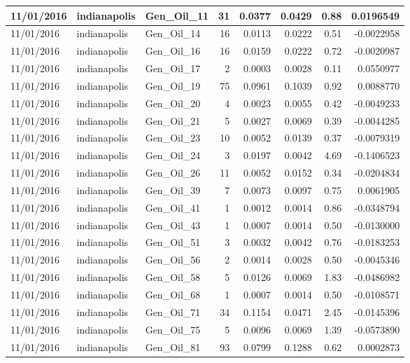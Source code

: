 \documentclass[
  letterpaper,
  DIV=11,
  numbers=noendperiod]{scrartcl}
\begin{document}
\begin{tabular}{l|l|l|r|r|r|r|r}
\hline
11/01/2016 & indianapolis & Gen\_Oil\_11 & 31 & 0.0377 & 0.0429 & 0.88 & 0.0196549\\
\hline
11/01/2016 & indianapolis & Gen\_Oil\_14 & 16 & 0.0113 & 0.0222 & 0.51 & -0.0022958\\
\hline
11/01/2016 & indianapolis & Gen\_Oil\_16 & 16 & 0.0159 & 0.0222 & 0.72 & -0.0020987\\
\hline
11/01/2016 & indianapolis & Gen\_Oil\_17 & 2 & 0.0003 & 0.0028 & 0.11 & 0.0550977\\
\hline
11/01/2016 & indianapolis & Gen\_Oil\_19 & 75 & 0.0961 & 0.1039 & 0.92 & 0.0088770\\
\hline
11/01/2016 & indianapolis & Gen\_Oil\_20 & 4 & 0.0023 & 0.0055 & 0.42 & -0.0049233\\
\hline
11/01/2016 & indianapolis & Gen\_Oil\_21 & 5 & 0.0027 & 0.0069 & 0.39 & -0.0044285\\
\hline
11/01/2016 & indianapolis & Gen\_Oil\_23 & 10 & 0.0052 & 0.0139 & 0.37 & -0.0079319\\
\hline
11/01/2016 & indianapolis & Gen\_Oil\_24 & 3 & 0.0197 & 0.0042 & 4.69 & -0.1406523\\
\hline
11/01/2016 & indianapolis & Gen\_Oil\_26 & 11 & 0.0052 & 0.0152 & 0.34 & -0.0204834\\
\hline
11/01/2016 & indianapolis & Gen\_Oil\_39 & 7 & 0.0073 & 0.0097 & 0.75 & 0.0061905\\
\hline
11/01/2016 & indianapolis & Gen\_Oil\_41 & 1 & 0.0012 & 0.0014 & 0.86 & -0.0348794\\
\hline
11/01/2016 & indianapolis & Gen\_Oil\_43 & 1 & 0.0007 & 0.0014 & 0.50 & -0.0130000\\
\hline
11/01/2016 & indianapolis & Gen\_Oil\_51 & 3 & 0.0032 & 0.0042 & 0.76 & -0.0183253\\
\hline
11/01/2016 & indianapolis & Gen\_Oil\_56 & 2 & 0.0014 & 0.0028 & 0.50 & -0.0045346\\
\hline
11/01/2016 & indianapolis & Gen\_Oil\_58 & 5 & 0.0126 & 0.0069 & 1.83 & -0.0486982\\
\hline
11/01/2016 & indianapolis & Gen\_Oil\_68 & 1 & 0.0007 & 0.0014 & 0.50 & -0.0108571\\
\hline
11/01/2016 & indianapolis & Gen\_Oil\_71 & 34 & 0.1154 & 0.0471 & 2.45 & -0.0145396\\
\hline
11/01/2016 & indianapolis & Gen\_Oil\_75 & 5 & 0.0096 & 0.0069 & 1.39 & -0.0573890\\
\hline
11/01/2016 & indianapolis & Gen\_Oil\_81 & 93 & 0.0799 & 0.1288 & 0.62 & 0.0002873\\

\end{tabular}
\end{document}
